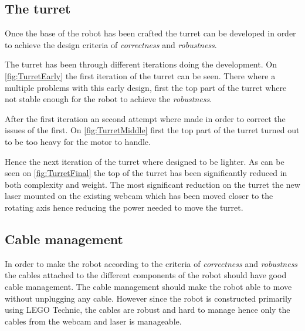 \subsection{The turret}
Once the base of the robot has been crafted the turret can be developed in order to achieve the design criteria of \textit{correctness} and \textit{robustness}. 

The turret has been through different iterations doing the development. 
On \autoref{fig:TurretEarly} the first iteration of the turret can be seen.
There where a multiple problems with this early design, first the top part of the turret where not stable enough for the robot to achieve the \textit{robustness}.

After the first iteration an second attempt where made in order to correct the issues of the first. 
On \autoref{fig:TurretMiddle} first the top part of the turret turned out to be too heavy for the motor to handle. 



Hence the next iteration of the turret where designed to be lighter. 
As can be seen on \autoref{fig:TurretFinal} the top of the turret has been significantly reduced in both complexity and weight. 
The most significant reduction on the turret the new laser mounted on the existing webcam which has been moved closer to the rotating axis hence reducing the power needed to move the turret. 

\subsection{Cable management}
In order to make the robot according to the criteria of \textit{correctness} and \textit{robustness} the cables attached to the different components of the robot should have good cable management. 
The cable management should make the robot able to move without unplugging any cable.
However since the robot is constructed primarily using LEGO Technic, the cables are robust and hard to manage hence only the cables from the webcam and laser is manageable. 